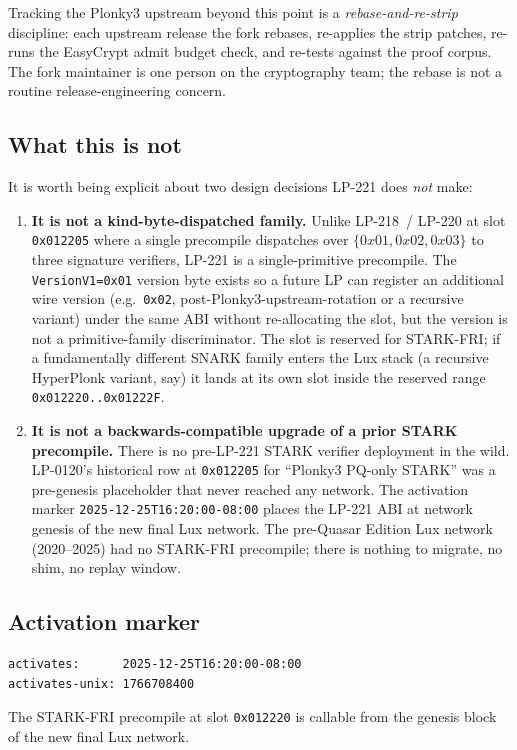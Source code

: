 Tracking the Plonky3 upstream beyond this point is a
\emph{rebase-and-re-strip} discipline: each upstream release the
fork rebases, re-applies the strip patches, re-runs the EasyCrypt
admit budget check, and re-tests against the proof corpus. The fork
maintainer is one person on the cryptography team; the rebase is
not a routine release-engineering concern.

\subsection{What this is not}

It is worth being explicit about two design decisions LP-221 does
\emph{not} make:

\begin{enumerate}[leftmargin=2em,nosep]
\item \textbf{It is not a kind-byte-dispatched family.} Unlike
  LP-218~/ LP-220 at slot \texttt{0x012205} where a single precompile
  dispatches over $\{0x01, 0x02, 0x03\}$ to three signature
  verifiers, LP-221 is a single-primitive precompile. The
  \texttt{VersionV1=0x01} version byte exists so a future LP can
  register an additional wire version (e.g.\ \texttt{0x02},
  post-Plonky3-upstream-rotation or a recursive variant) under the
  same ABI without re-allocating the slot, but the
  version is not a primitive-family discriminator. The slot is
  reserved for STARK-FRI; if a fundamentally different SNARK family
  enters the Lux stack (a recursive HyperPlonk variant, say) it
  lands at its own slot inside the reserved range
  \texttt{0x012220..0x01222F}.
\item \textbf{It is not a backwards-compatible upgrade of a prior
  STARK precompile.} There is no pre-LP-221 STARK verifier
  deployment in the wild. LP-0120's historical row at
  \texttt{0x012205} for ``Plonky3 PQ-only STARK'' was a
  pre-genesis placeholder that never reached any network. The
  activation marker \texttt{2025-12-25T16:20:00-08:00} places the
  LP-221 ABI at network genesis of the new final Lux network. The
  pre-Quasar Edition Lux network (2020--2025) had no STARK-FRI
  precompile; there is nothing to migrate, no shim, no replay
  window.
\end{enumerate}

\subsection{Activation marker}

\begin{verbatim}
activates:      2025-12-25T16:20:00-08:00
activates-unix: 1766708400
\end{verbatim}

The STARK-FRI precompile at slot \texttt{0x012220} is callable from
the genesis block of the new final Lux network.
